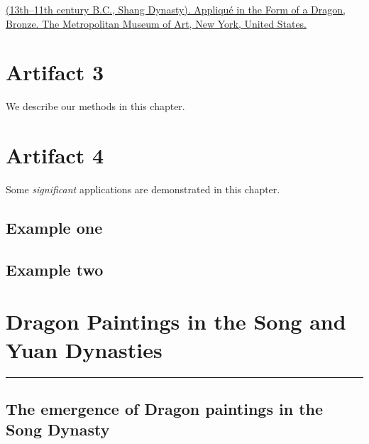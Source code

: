 \documentclass[
]{book}
\begin{document}
\href{https://www.metmuseum.org/art/collection/search/49505}{(13th--11th century B.C., Shang Dynasty). Appliqué in the Form of a Dragon, Bronze. The Metropolitan Museum of Art, New York, United States.}

\hypertarget{artifact3}{%
\chapter*{Artifact 3}\label{artifact3}}

We describe our methods in this chapter.

\hypertarget{artifact4}{%
\chapter*{Artifact 4}\label{artifact4}}

Some \emph{significant} applications are demonstrated in this chapter.

\hypertarget{example-one}{%
\section{Example one}\label{example-one}}

\hypertarget{example-two}{%
\section{Example two}\label{example-two}}

\hypertarget{Dragon_Paintings}{%
\chapter*{Dragon Paintings in the Song and Yuan Dynasties}\label{Dragon_Paintings}}

\begin{center}\rule{0.5\linewidth}{0.5pt}\end{center}

\hypertarget{the-emergence-of-dragon-paintings-in-the-song-dynasty}{%
\section*{The emergence of Dragon paintings in the Song Dynasty}\label{the-emergence-of-dragon-paintings-in-the-song-dynasty}}
\end{document}
